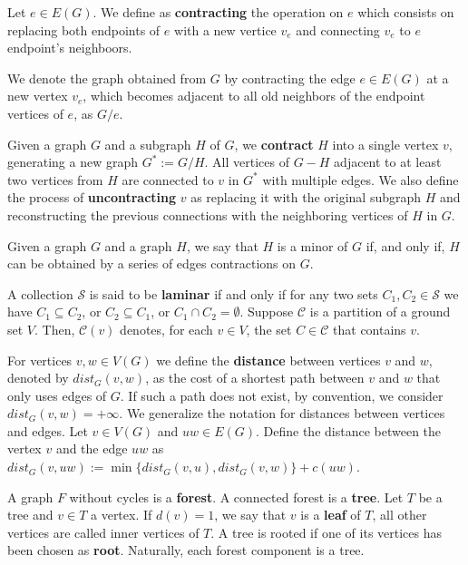 Let \(e \in E(G)\). We define as \textbf{contracting} the operation on \(e\) which consists on replacing both endpoints of \(e\) with a new vertice \(v_e\) and connecting \(v_e\) to \(e\) endpoint's neighboors.

We denote the graph obtained from \(G\) by contracting the edge \(e \in E(G)\) at a new vertex \(v_e\), which becomes adjacent to all old neighbors of the endpoint vertices of \(e\), as \(G / e\).

Given a graph \(G\) and a subgraph \(H\) of \(G\), we \textbf{contract} \(H\) into a single vertex \(v\), generating a new graph \(G^\ast := G / H\). All vertices of \(G - H\) adjacent to at least two vertices from \(H\) are connected to \(v\) in \(G^\ast\) with multiple edges. We also define the process of \textbf{uncontracting} \(v\) as replacing it with the original subgraph \(H\) and reconstructing the previous connections with the neighboring vertices of \(H\) in \(G\).

Given a graph \(G\) and a graph \(H\), we say that \(H\) is a minor of \(G\) if, and only if, \(H\) can be obtained by a series of edges contractions on \(G\).

A collection \(\mathcal{S}\) is said to be \textbf{laminar} if and only if for any two sets \(C_1, C_2 \in \mathcal{S}\) we have \(C_1 \subseteq C_2\), or \(C_2 \subseteq C_1\), or \(C_1 \cap C_2 = \emptyset\). Suppose \(\mathcal{C}\) is a partition of a ground set \(V\). Then, \(\mathcal{C}(v)\) denotes, for each \(v \in V\), the set \(C \in \mathcal{C}\) that contains \(v\).

For vertices \(v, w \in V(G)\) we define the \textbf{distance} between vertices $v$ and $w$, denoted by \(dist_G(v, w)\), as the cost of a shortest path between \(v\) and \(w\) that only uses edges of \(G\). If such a path does not exist, by convention, we consider \(dist_G(v, w) = +\infty\). We generalize the notation for distances between vertices and edges. Let \(v \in V(G)\) and \(uw \in E(G)\). Define the distance between the vertex \(v\) and the edge \(uw\) as \(dist_G(v, uw) := \min\{dist_G(v, u), dist_G(v, w)\} + c(uw)\).

A graph \(F\) without cycles is a \textbf{forest}. A connected forest is a \textbf{tree}. Let \(T\) be a tree and \(v \in T\) a vertex. If \(d(v) = 1\), we say that \(v\) is a \textbf{leaf} of \(T\), all other vertices are called inner vertices of \(T\). A tree is rooted if one of its vertices has been chosen as \textbf{root}. Naturally, each forest component is a tree. 

